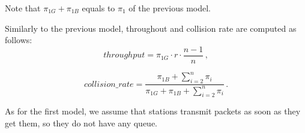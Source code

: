 Note that $\pi_{1G} + \pi_{1B}$ equals to $\pi_1$ of the previous model.

Similarly to the previous model, throughout and collision rate are computed as follows:
\begin{equation*}
    throughput = \pi_{1G} \cdot r \cdot \frac{n-1}{n}\,,
\end{equation*}

\begin{equation*}
    collision\_rate = \frac{\pi_{1B} + \sum_{i = 2}^{n} \pi_i}{\pi_{1G} + \pi_{1B} + \sum_{i = 2}^{n} \pi_i}\,.
\end{equation*}

As for the first model, we assume that stations transmit packets as soon as they get them, so they do not have any queue.
